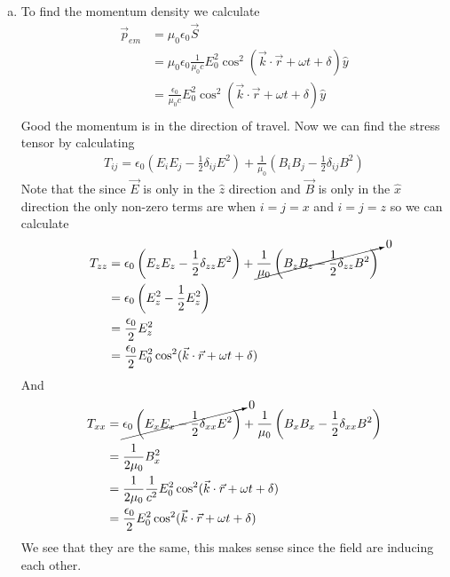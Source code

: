 \documentclass[11pt]{article}
\numberwithin{equation}{section}
\begin{document}
\begin{enumerate}[(a)]
\item
To find the momentum density we calculate 
\begin{align*}
\vec{p}_{em} &= \mu_0\epsilon_0\vec{S}\\
&= \mu_0\epsilon_0\frac{1}{\mu_0c}E_0^2\cos^2(\vec{k}\cdot\vec{r}+\omega t+\delta)\hat{y}\\
&= \frac{\epsilon_0}{\mu_0c}E_0^2\cos^2(\vec{k}\cdot\vec{r}+\omega t+\delta)\hat{y}\\
\end{align*}
Good the momentum is in the direction of travel. Now we can find the stress tensor by calculating 
\begin{align*}
T_{ij} = \epsilon_0\left(E_iE_j-\frac{1}{2}\delta_{ij}E^2\right)+\frac{1}{\mu_0}\left(B_iB_j-\frac{1}{2}\delta_{ij}B^2\right)
\end{align*}
Note that the since $\vec{E}$ is only in the $\hat{z}$ direction and $\vec{B}$ is only in the $\hat{x}$ direction the only non-zero terms are when $i=j=x$ and $i=j=z$ so we can calculate
\begin{align*}
T_{zz} &= \epsilon_0\left(E_zE_z-\frac{1}{2}\delta_{zz}E^2\right)+\cancelto{0}{\frac{1}{\mu_0}\left(B_zB_z-\frac{1}{2}\delta_{zz}B^2\right)}\\
&= \epsilon_0\left(E_z^2-\frac{1}{2}E_z^2\right)\\
&= \frac{\epsilon_0}{2}E_z^2\\
&= \frac{\epsilon_0}{2}E_0^2\cos^2(\vec{k}\cdot\vec{r}+\omega t+\delta)
\end{align*}
And
\begin{align*}
T_{xx} &= \cancelto{0}{\epsilon_0\left(E_xE_x-\frac{1}{2}\delta_{xx}E^2\right)}+\frac{1}{\mu_0}\left(B_xB_x-\frac{1}{2}\delta_{xx}B^2\right)\\
&= \frac{1}{2\mu_0}B_x^2\\
&= \frac{1}{2\mu_0}\frac{1}{c^2}E_0^2\cos^2(\vec{k}\cdot\vec{r}+\omega t+\delta)\\
&= \frac{\epsilon_0}{2}E_0^2\cos^2(\vec{k}\cdot\vec{r}+\omega t+\delta)
\end{align*}
We see that they are the same, this makes sense since the field are inducing each other.


\end{enumerate}
\end{document}
